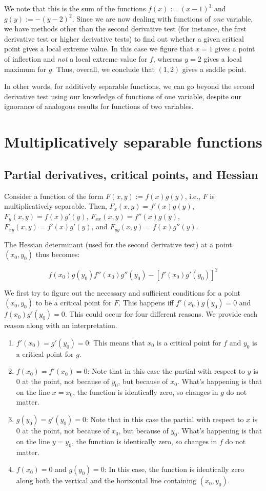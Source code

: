 \documentclass[10pt]{amsart}
\begin{document}
We note that this is the sum of the functions $f(x) := (x-1)^3$ and
$g(y) := -(y-2)^2$. Since we are now dealing with functions of {\em one}
variable, we have methods other than the second derivative test (for
instance, the first derivative test or higher derivative tests) to
find out whether a given critical point gives a local extreme value. In
this case we figure that $x = 1$ gives a point of inflection and {\em
not} a local extreme value for $f$, whereas $y = 2$ gives a local
maximum for $g$. Thus, overall, we conclude that $(1,2)$ gives a
saddle point.

In other words, for additively separable functions, we can go beyond
the second derivative test using our knowledge of functions of one
variable, despite our ignorance of analogous results for functions of
two variables.
\section{Multiplicatively separable functions}
\subsection{Partial derivatives, critical points, and Hessian}

Consider a function of the form $F(x,y) := f(x)g(y)$, i.e., $F$ is
multiplicatively separable. Then, $F_x(x,y) = f'(x)g(y)$, $F_y(x,y) =
f(x)g'(y)$, $F_{xx}(x,y) = f''(x)g(y)$, $F_{xy}(x,y) = f'(x)g'(y)$,
and $F_{yy}(x,y) = f(x)g''(y)$. 

The Hessian determinant (used for the second derivative test) at a
point $(x_0,y_0)$ thus becomes:

$$f(x_0)g(y_0)f''(x_0)g''(y_0) - [f'(x_0)g'(y_0)]^2$$

We first try to figure out the necessary and sufficient conditions for
a point $(x_0,y_0)$ to be a critical point for $F$. This happens iff
$f'(x_0)g(y_0) = 0$ and $f(x_0)g'(y_0) = 0$. This could occur for four
different reasons. We provide each reason along with an
interpretation.

\begin{enumerate}
\item $f'(x_0) = g'(y_0) = 0$: This means that $x_0$ is a critical
  point for $f$ and $y_0$ is a critical point for $g$.
\item $f(x_0) = f'(x_0) = 0$: Note that in this case the partial with
  respect to $y$ is $0$ at the point, not because of $y_0$, but
  because of $x_0$. What's happening is that on the line $x = x_0$,
  the function is identically zero, so changes in $g$ do not matter.
\item $g(y_0) = g'(y_0) = 0$: Note that in this case the partial with
  respect to $x$ is $0$ at the point, not because of $x_0$, but
  because of $y_0$. What's happening is that on the line $y = y_0$,
  the function is identically zero, so changes in $f$ do not matter.
\item $f(x_0) = 0$ and $g(y_0) = 0$: In this case, the function is
  identically zero along both the vertical and the horizontal line
  containing $(x_0,y_0)$.
\end{enumerate}
\end{document}
